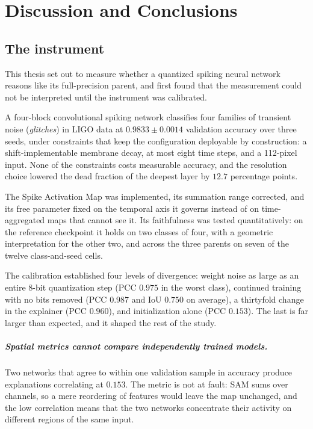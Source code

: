 \chapter{Discussion and Conclusions}
\label{ch:conclusions}

\section{The instrument}

This thesis set out to measure whether a quantized spiking neural network
reasons like its full-precision parent, and first found that the measurement
could not be interpreted until the instrument was calibrated.

A four-block convolutional spiking network classifies four families of transient
noise (\textit{glitches}) in LIGO data at $0.9833 \pm 0.0014$ validation
accuracy over three seeds, under constraints that keep the configuration
deployable by construction: a shift-implementable membrane decay, at most eight
time steps, and a 112-pixel input. None of the constraints costs measurable
accuracy, and the resolution choice lowered the dead fraction of the deepest
layer by $12.7$ percentage points.

The Spike Activation Map was implemented, its summation range corrected, and its
free parameter fixed on the temporal axis it governs instead of on
time-aggregated maps that cannot see it. Its faithfulness was tested
quantitatively: on the reference checkpoint it holds on two classes of four, with
a geometric interpretation for the other two, and across the three parents on
seven of the twelve class-and-seed cells.

The calibration established four levels of divergence: weight noise as large as
an entire 8-bit quantization step (PCC $0.975$ in the worst class), continued
training with no bits removed (PCC $0.987$ and IoU $0.750$ on average), a
thirtyfold change in the explainer (PCC $0.960$), and initialization alone (PCC
$0.153$). The last is far larger than expected, and it shaped the rest of the
study.

\paragraph{Spatial metrics cannot compare independently trained models.} Two
networks that agree to within one validation sample in accuracy produce
explanations correlating at $0.153$. The metric is not at fault: SAM sums over
channels, so a mere reordering of features would leave the map unchanged, and the
low correlation means that the two networks concentrate their activity on
different regions of the same input.


